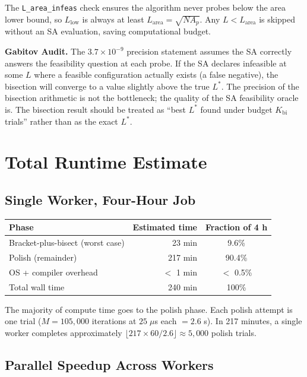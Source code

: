 \documentclass[11pt,oneside]{article}
\newcommand{\gabitov}[1]{\begin{gabitovbox}\textbf{Gabitov Audit.} #1\end{gabitovbox}}
\begin{document}
The \texttt{L\_area\_infeas} check ensures the algorithm never probes
below the area lower bound, so $L_{\mathrm{low}}$ is always at least
$L_{\mathrm{area}} = \sqrt{N A_p}$. Any $L < L_{\mathrm{area}}$ is
skipped without an SA evaluation, saving computational budget.

\gabitov{%
The $3.7 \times 10^{-9}$ precision statement assumes the SA correctly
answers the feasibility question at each probe. If the SA declares
infeasible at some $L$ where a feasible configuration actually exists
(a false negative), the bisection will converge to a value slightly
above the true $L^*$. The precision of the bisection arithmetic is not
the bottleneck; the quality of the SA feasibility oracle is. The
bisection result should be treated as ``best $L^*$ found under budget
$K_{\mathrm{bi}}$ trials'' rather than as the exact $L^*$.%
}

\section{Total Runtime Estimate}
\label{sec:runtime}

\subsection{Single Worker, Four-Hour Job}

\begin{center}
\begin{tabular}{lrc}
\toprule
Phase & Estimated time & Fraction of 4 h \\
\midrule
Bracket-plus-bisect (worst case) & 23 min & 9.6\% \\
Polish (remainder) & 217 min & 90.4\% \\
OS + compiler overhead & $<$ 1 min & $<$ 0.5\% \\
\midrule
Total wall time & 240 min & 100\% \\
\bottomrule
\end{tabular}
\end{center}

The majority of compute time goes to the polish phase. Each polish
attempt is one trial ($M = 105{,}000$ iterations at $25\;\mu$s each
$= 2.6$ s). In 217 minutes, a single worker completes approximately
$\lfloor 217 \times 60 / 2.6 \rfloor \approx 5{,}000$ polish trials.

\subsection{Parallel Speedup Across Workers}
\end{document}
